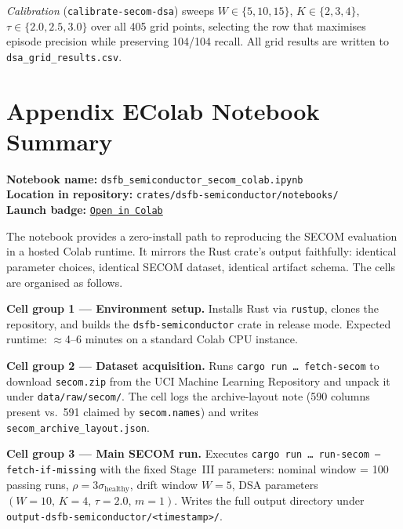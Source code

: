 \documentclass[11pt,letterpaper]{article}
\theoremstyle{scresult}
\begin{document}
\noindent\textit{Calibration} (\texttt{calibrate-secom-dsa}) sweeps
$W \in \{5,10,15\}$, $K \in \{2,3,4\}$, $\tau \in \{2.0,2.5,3.0\}$
over all 405 grid points, selecting the row that maximises episode
precision while preserving 104/104 recall.  All grid results are
written to \texttt{dsa\_grid\_results.csv}.

\clearpage

\section*{Appendix E\quad Colab Notebook Summary}
\label{app:colab}

\noindent\textbf{Notebook name:}
\texttt{dsfb\_semiconductor\_secom\_colab.ipynb}\\
\textbf{Location in repository:}
\texttt{crates/dsfb-semiconductor/notebooks/}\\
\textbf{Launch badge:}
\href{https://colab.research.google.com/github/infinityabundance/dsfb/blob/main/crates/dsfb-semiconductor/notebooks/dsfb_semiconductor_secom_colab.ipynb}%
{\texttt{Open in Colab}}

\medskip
The notebook provides a zero-install path to reproducing the SECOM evaluation
in a hosted Colab runtime.  It mirrors the Rust crate's output faithfully:
identical parameter choices, identical SECOM dataset, identical artifact
schema.  The cells are organised as follows.

\medskip
\noindent\textbf{Cell group 1 --- Environment setup.}
Installs Rust via \texttt{rustup}, clones the repository, and builds the
\texttt{dsfb-semiconductor} crate in release mode.  Expected runtime:
$\approx$4--6 minutes on a standard Colab CPU instance.

\medskip
\noindent\textbf{Cell group 2 --- Dataset acquisition.}
Runs \texttt{cargo run \ldots{} fetch-secom} to download
\texttt{secom.zip} from the UCI Machine Learning Repository and unpack it
under \texttt{data/raw/secom/}.  The cell logs the archive-layout note
(590 columns present vs.\ 591 claimed by \texttt{secom.names}) and writes
\texttt{secom\_archive\_layout.json}.

\medskip
\noindent\textbf{Cell group 3 --- Main SECOM run.}
Executes \texttt{cargo run \ldots{} run-secom --fetch-if-missing} with the
fixed Stage~III parameters:
nominal window = 100 passing runs,
$\rho = 3\sigma_\text{healthy}$,
drift window $W=5$,
DSA parameters $(W\!=\!10,\,K\!=\!4,\,\tau\!=\!2.0,\,m\!=\!1)$.
Writes the full output directory under
\texttt{output-dsfb-semiconductor/<timestamp>/}.
\end{document}

